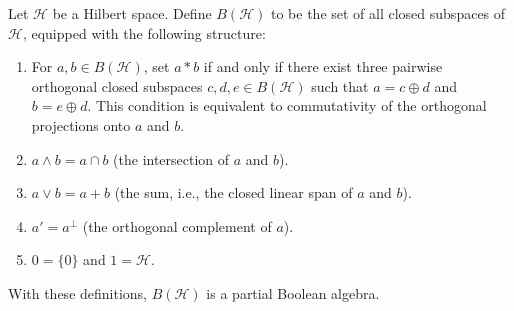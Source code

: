 Let $\mathcal{H}$ be a Hilbert space. Define $B(\mathcal{H})$ to be the set of all closed subspaces of $\mathcal{H}$, equipped with the following structure:

\begin{enumerate}
\item[(a)] For $a, b \in B(\mathcal{H})$, set $a * b$ if and only if there exist three pairwise orthogonal closed subspaces $c, d, e \in B(\mathcal{H})$ such that $a = c \oplus d$ and $b = e \oplus d$. This condition is equivalent to commutativity of the orthogonal projections onto $a$ and $b$.
\item[(b)] $a \wedge b = a \cap b$ (the intersection of $a$ and $b$).
\item[(c)] $a \vee b = a + b$ (the sum, i.e., the closed linear span of $a$ and $b$).
\item[(d)] $a' = a^{\perp}$ (the orthogonal complement of $a$).
\item[(e)] $0 = \{0\}$ and $1 = \mathcal{H}$.
\end{enumerate}

With these definitions, $B(\mathcal{H})$ is a partial Boolean algebra.
